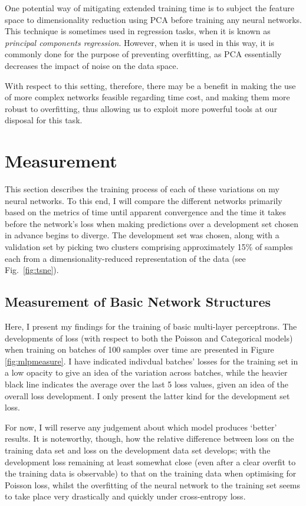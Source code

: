 \documentclass[10pt, twoside, a4paper]{article}
\begin{document}
	One potential way of mitigating extended training time is to subject the feature space 
	to dimensionality reduction using PCA before training any neural networks. This technique 
	is sometimes used in regression tasks, when it is known as \emph{principal components 
	regression}. However, when it is used in this way, it is commonly done for the purpose of 
	preventing overfitting, as PCA essentially decreases the impact of noise on the data space. 

	With respect to this setting, therefore, there may be a benefit in making the use of more
	complex networks feasible regarding time cost, and making them more robust to overfitting,
	thus allowing us to exploit more powerful tools at our disposal for this task.

	\section{Measurement}
	\label{section:measure}
	This section describes the training process of each of these variations on my neural 
	networks. To this end, I will compare the different networks primarily based on the 
	metrics of time until apparent convergence and the time it takes before the 
	network's loss when making predictions over a development set chosen in advance begins to 
	diverge. The development set was chosen, along with a validation set by picking two clusters comprising approximately 
	15\% of samples each from a dimensionality-reduced representation of the data (see Fig.\ \ref{fig:tsne}).  

	\subsection{Measurement of Basic Network Structures}
	Here, I present my findings for the training of basic multi-layer perceptrons. The 
	developments of loss (with respect to both the Poisson and Categorical models) when 
	training on batches of 100 samples over time are presented in Figure \ref{fig:mlpmeasure}.
	I have indicated indivdual batches' losses for the training set in a low opacity to give 
	an idea of the variation across batches, while the heavier black line indicates the 
	average over the last 5 loss values, given an idea of the overall loss development. I only
	present the latter kind for the development set loss.

	For now, I will reserve any judgement about which model produces `better' results. It is 
	noteworthy, though, how the relative difference between loss on the training data set and 
	loss on the development data set develops; with the development loss remaining at least 
	somewhat close (even after a clear overfit to the training data is observable) to that on 
	the training data when optimising for Poisson loss, whilst the 
	overfitting of the neural network to the training set seems to take place very drastically 
	and quickly under cross-entropy loss. 
\end{document}
